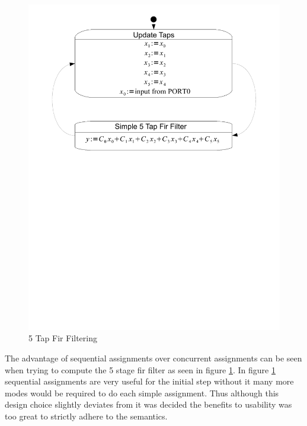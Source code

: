\begin{figure}[htp]
    \centering
    \includegraphics[trim= 10mm 145mm 10mm 10mm, clip, width=\imgmedium]{./images/state_uml2_fir.pdf}
    \caption{5 Tap Fir Filtering}
    \label{fig:state_uml2_fir}
\end{figure}

The advantage of sequential assignments over concurrent assignments can be seen when trying to compute the 5 stage fir filter as seen in figure \ref{fig:state_uml2_fir}. In figure \ref{fig:state_uml2_fir} sequential assignments are very useful for the initial step without it many more modes would be required to do each simple assignment. Thus although this design choice slightly deviates from \cite{UML2} it was decided the benefits to usability was too great to strictly adhere to the \cite{UML2} semantics.

